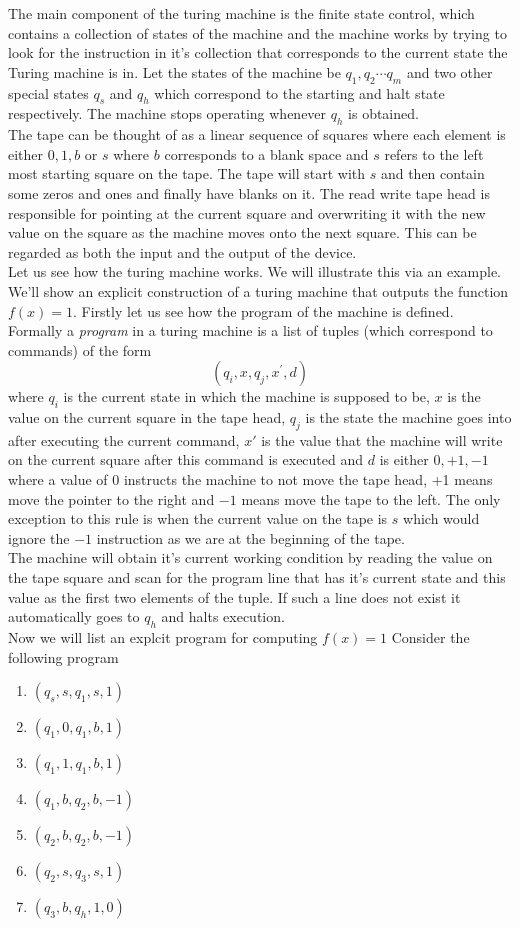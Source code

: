 The main component of the turing machine is the finite state control, which contains a collection of states of the machine and the machine works by trying to look for the instruction in it's collection that corresponds to the current state the Turing machine is in.
Let the states of the machine be $q_1, q_2 \cdots q_m$ and two other special states $q_s$ and $q_h$ which correspond to the starting and halt state respectively. The machine stops operating whenever $q_h$ is obtained. \\ The tape can be thought of as a linear sequence of squares where each element is either $0, 1, b$ or $s$ where $b$ corresponds to a blank space and $s$ refers to the left most starting square on the tape. The tape will start with $s$ and then contain some zeros and ones and finally have blanks on it. The read write tape head is responsible for pointing at the current square and overwriting it with the new value on the square as the machine moves onto the next square. This can be regarded as both the input and the output of the device. 
\\ Let us see how the turing machine works. We will illustrate this via an example. We'll show an explicit construction of a turing machine that outputs the function $f(x) = 1$.
Firstly let us see how the program of the machine is defined. Formally a \textit{program} in a turing machine is a list of tuples (which correspond to commands) of the form 
$$ \left( q_i, x, q_j, x^{'}, d \right)$$
where $q_i$ is the current state in which the machine is supposed to be, $x$ is the value on the current square in the tape head, $q_j$ is the state the machine goes into after executing the current command, $x'$ is the value that the machine will write on the current square after this command is executed and $d$ is either $0, +1, -1$ where a value of $0$ instructs the machine to not move the tape head, +1 means move the pointer to the right and $-1$ means move the tape to the left. The only exception to this rule is when the current value on the tape is $s$ which would ignore the $-1$ instruction as we are at the beginning of the tape.
\\The machine will obtain it's current working condition by reading the value on the tape square and scan for the program line that has it's current state and this value as the first two elements of the tuple. If such a line does not exist it automatically goes to $q_h$ and halts execution.
\\ Now we will list an explcit program for computing $f(x)=1$
Consider the following program
\begin{enumerate}
    \item $ \left( q_s, s, q_1, s, 1 \right)$
    \item $ \left( q_1, 0, q_1, b, 1 \right)$
    \item $ \left( q_1, 1, q_1, b, 1 \right)$
    \item $ \left( q_1, b, q_2, b, -1 \right)$
    \item $ \left( q_2, b, q_2, b, -1 \right)$
    \item $ \left( q_2, s, q_3, s, 1 \right)$
    \item $ \left( q_3, b, q_h, 1, 0 \right)$
\end{enumerate}

